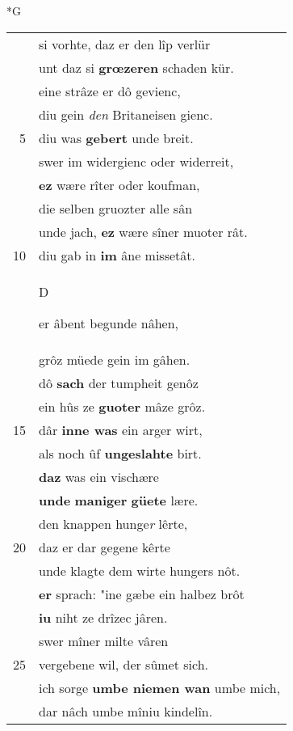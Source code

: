 \documentclass[8pt,a4paper,notitlepage]{article}
\begin{document}
\begin{table}[ht]
\begin{minipage}[t]{0.5\linewidth}
\small
\begin{center}*G
\end{center}
\begin{tabular}{rl}
 & si vorhte, daz er den lîp verlür\\ 
 & unt daz si \textbf{grœzeren} schaden kür.\\ 
 & eine strâze er dô gevienc,\\ 
 & diu gein \textit{den} Britaneisen gienc.\\ 
5 & diu was \textbf{gebert} unde breit.\\ 
 & swer im widergienc oder widerreit,\\ 
 & \textbf{ez} wære rîter oder koufman,\\ 
 & die selben gruozter alle sân\\ 
 & unde jach, \textbf{ez} wære sîner muoter rât.\\ 
10 & diu gab in \textbf{im} âne missetât.\\ 
 & \begin{large}D\end{large}er âbent begunde nâhen,\\ 
 & grôz müede gein im gâhen.\\ 
 & dô \textbf{sach} der tumpheit genôz\\ 
 & ein hûs ze \textbf{guoter} mâze grôz.\\ 
15 & dâr \textbf{inne was} ein arger wirt,\\ 
 & als noch ûf \textbf{ungeslahte} birt.\\ 
 & \textbf{daz} was ein vischære\\ 
 & \textbf{unde} \textbf{maniger} \textbf{güete} lære.\\ 
 & den knappen hunge\textit{r} lêrte,\\ 
20 & daz er dar gegene kêrte\\ 
 & unde klagte dem wirte hungers nôt.\\ 
 & \textbf{er} sprach: "ine gæbe ein halbez brôt\\ 
 & \textbf{iu} niht ze drîzec jâren.\\ 
 & swer mîner milte vâren\\ 
25 & vergebene wil, der sûmet sich.\\ 
 & ich sorge \textbf{umbe niemen wan} umbe mich,\\ 
 & dar nâch umbe mîniu kindelîn.\\ 

\end{tabular}
\end{minipage}
\end{table}
\end{document}
